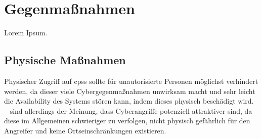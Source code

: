\documentclass[final,bibliography=totocnumbered]{include/sikseminar}
\newcommand{\cps}{\glspl{cps}\xspace}
\begin{document}



%

\section{Gegenmaßnahmen}\label{sec:gegenmassnahmen}





%

Lorem Ipsum.

\subsection{Physische Maßnahmen}\label{subsec:physisch}
Physischer Zugriff auf \cps sollte für unautorisierte Personen möglichst verhindert werden, da dieser viele Cybergegenmaßnahmen unwirksam macht und sehr leicht die Availability des Systems stören kann, indem dieses physisch beschädigt wird.
\citeauthor{CAS08}~\cite{CAS08} sind allerdings der Meinung, dass Cyberangriffe potenziell attraktiver sind, da diese im Allgemeinen schwieriger zu verfolgen, nicht physisch gefährlich für den Angreifer und keine Ortseinschränkungen existieren.
\end{document}
